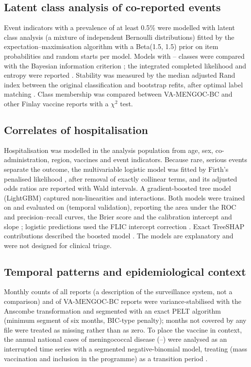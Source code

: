 \documentclass[11pt]{article}
\begin{document}
\subsection{Latent class analysis of co-reported events}\label{sec:m-lca}
Event indicators with a prevalence of at least 0.5\% were modelled with latent class analysis (a
mixture of independent Bernoulli distributions) fitted by the expectation--maximisation algorithm
\cite{Dempster1977} with a Beta(1.5, 1.5) prior on item probabilities and \POLCAStarts{} random
starts per model. Models with \POLCAKMin--\POLCAKMax{} classes were compared with the Bayesian information criterion
\cite{Schwarz1978}; the integrated completed likelihood \cite{Biernacki2000} and entropy were
reported \cite{Nylund2007}. Stability was measured by the median adjusted Rand index
\cite{Hubert1985} between the original classification and \POLCABootstrap{} bootstrap refits, after optimal
label matching \cite{Kuhn1955}. Class membership was compared between VA-MENGOC-BC and other
Finlay vaccine reports with a $\chi^2$ test.

\subsection{Correlates of hospitalisation}\label{sec:m-hosp}
Hospitalisation was modelled in the analysis population from age, sex, co-administration,
region, vaccines and event indicators. Because rare, serious events separate the outcome, the multivariable logistic model
was fitted by Firth's penalised likelihood \cite{Firth1993,Heinze2002}, after removal of exactly
collinear terms, and its adjusted odds ratios are reported with Wald intervals. A gradient-boosted
tree model (LightGBM) \cite{Ke2017} captured non-linearities and interactions. Both models were
trained on \POTrainYears{} and evaluated on \POTestYears{} (temporal validation), reporting the area under
the ROC and precision--recall curves, the Brier score and the calibration intercept and slope
\cite{VanCalster2019,Collins2024}; logistic predictions used the FLIC intercept correction
\cite{Puhr2017}. Exact TreeSHAP contributions described the boosted model
\cite{Lundberg2020}. The models are explanatory and were not designed for clinical triage.

\subsection{Temporal patterns and epidemiological context}\label{sec:m-time}
Monthly counts of all reports (a description of the surveillance system, not a comparison) and
of VA-MENGOC-BC reports were variance-stabilised with the Anscombe transformation
\cite{Anscombe1948} and segmented with an exact PELT algorithm \cite{Killick2012,Truong2020}
(minimum segment of six months, BIC-type penalty); months not covered by any file were
treated as missing rather than as zero. To place the vaccine in context, the annual
national cases of meningococcal disease (\POITSFirstYear--\POITSLastYear) were analysed as an
interrupted time series with a segmented negative-binomial model, treating \POITSTransition{}
(mass vaccination and inclusion in the programme) as a transition period \cite{Bernal2017}.
\end{document}
